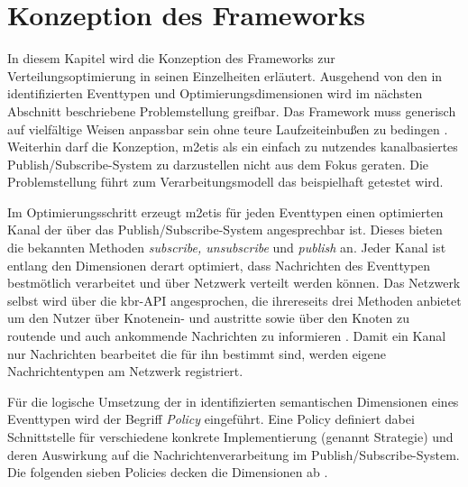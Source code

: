 \chapter{Konzeption des Frameworks}
\label{chap:konzeption_pubsub}
In diesem Kapitel wird die Konzeption des Frameworks zur Verteilungsoptimierung in seinen Einzelheiten erläutert. Ausgehend von den in \cite{Ficher2010a} identifizierten Eventtypen und Optimierungsdimensionen wird im nächsten Abschnitt beschriebene Problemstellung greifbar. Das Framework muss generisch auf vielfältige Weisen anpassbar sein ohne teure Laufzeiteinbußen zu bedingen \cite{NEW_PAPER} . Weiterhin darf die Konzeption, \ac{m2etis} als ein einfach zu nutzendes kanalbasiertes Publish/Subscribe-System zu darzustellen nicht aus dem Fokus geraten. Die Problemstellung führt zum Verarbeitungsmodell das beispielhaft getestet wird.

Im Optimierungsschritt erzeugt \ac{m2etis} für jeden Eventtypen einen optimierten Kanal der über das Publish/Subscribe-System angesprechbar ist. Dieses bieten die bekannten Methoden \emph{subscribe, unsubscribe} und \emph{publish} an. Jeder Kanal ist entlang den Dimensionen derart optimiert, dass Nachrichten des Eventtypen bestmötlich verarbeitet und über Netzwerk verteilt werden können. Das Netzwerk selbst wird über die \ac{kbr}-API angesprochen, die ihrereseits drei Methoden anbietet um den Nutzer über Knotenein- und austritte sowie über den Knoten zu routende und auch ankommende Nachrichten zu informieren \cite{Dabek2003Towards}. Damit ein Kanal nur Nachrichten bearbeitet die für ihn bestimmt sind, werden eigene Nachrichtentypen am Netzwerk registriert.

Für die logische Umsetzung der in \cite{Fischer2010Event} identifizierten semantischen Dimensionen eines Eventtypen wird der Begriff \emph{Policy} eingeführt. Eine Policy definiert dabei Schnittstelle für verschiedene konkrete Implementierung (genannt Strategie) und deren Auswirkung auf die Nachrichtenverarbeitung im Publish/Subscribe-System. Die folgenden sieben Policies decken die Dimensionen ab \cite{NEW_PAPER}.

